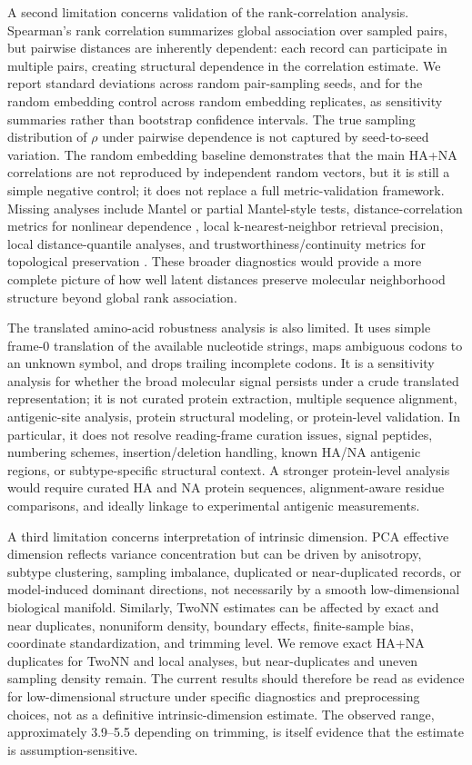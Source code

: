 \documentclass[11pt]{article}
\begin{document}
A second limitation concerns validation of the rank-correlation analysis. Spearman's rank correlation summarizes global association over sampled pairs, but pairwise distances are inherently dependent: each record can participate in multiple pairs, creating structural dependence in the correlation estimate. We report standard deviations across random pair-sampling seeds, and for the random embedding control across random embedding replicates, as sensitivity summaries rather than bootstrap confidence intervals. The true sampling distribution of $\rho$ under pairwise dependence is not captured by seed-to-seed variation. The random embedding baseline demonstrates that the main HA+NA correlations are not reproduced by independent random vectors, but it is still a simple negative control; it does not replace a full metric-validation framework. Missing analyses include Mantel or partial Mantel-style tests, distance-correlation metrics for nonlinear dependence \cite{szekely2007distance}, local k-nearest-neighbor retrieval precision, local distance-quantile analyses, and trustworthiness/continuity metrics for topological preservation \cite{lee2009quality}. These broader diagnostics would provide a more complete picture of how well latent distances preserve molecular neighborhood structure beyond global rank association.

The translated amino-acid robustness analysis is also limited. It uses simple frame-0 translation of the available nucleotide strings, maps ambiguous codons to an unknown symbol, and drops trailing incomplete codons. It is a sensitivity analysis for whether the broad molecular signal persists under a crude translated representation; it is not curated protein extraction, multiple sequence alignment, antigenic-site analysis, protein structural modeling, or protein-level validation. In particular, it does not resolve reading-frame curation issues, signal peptides, numbering schemes, insertion/deletion handling, known HA/NA antigenic regions, or subtype-specific structural context. A stronger protein-level analysis would require curated HA and NA protein sequences, alignment-aware residue comparisons, and ideally linkage to experimental antigenic measurements.

A third limitation concerns interpretation of intrinsic dimension. PCA effective dimension reflects variance concentration but can be driven by anisotropy, subtype clustering, sampling imbalance, duplicated or near-duplicated records, or model-induced dominant directions, not necessarily by a smooth low-dimensional biological manifold. Similarly, TwoNN estimates can be affected by exact and near duplicates, nonuniform density, boundary effects, finite-sample bias, coordinate standardization, and trimming level. We remove exact HA+NA duplicates for TwoNN and local analyses, but near-duplicates and uneven sampling density remain. The current results should therefore be read as evidence for low-dimensional structure under specific diagnostics and preprocessing choices, not as a definitive intrinsic-dimension estimate. The observed range, approximately 3.9--5.5 depending on trimming, is itself evidence that the estimate is assumption-sensitive.
\end{document}
